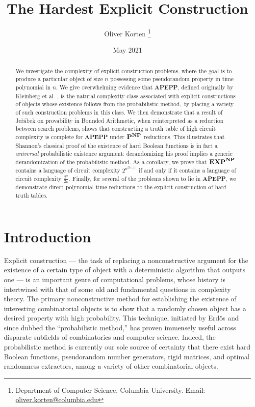 \documentclass[11pt]{article}
\author{Oliver Korten \thanks{Department of Computer Science, Columbia University. Email: \href{mailto:oliver.korten@columbia.edu}{oliver.korten@columbia.edu}}}
\date{May 2021}
\title{The Hardest Explicit Construction}
\newcommand{\varbound}{\frac{2^n}{2n}}
\def\cl{\bf}
\begin{document}
\maketitle
 
\begin{abstract}
We investigate the complexity of explicit construction problems, where the goal is to produce a particular object of size $n$ possessing some pseudorandom property in time polynomial in $n$. We give overwhelming evidence that {\cl APEPP}, defined originally by Kleinberg et al. \cite{total}, is the natural complexity class associated with explicit constructions of objects whose existence follows from the probabilistic method, by placing a variety of such construction problems in this class.
We then demonstrate that a result of Je\v{r}\'{a}bek \cite{Jerabek} on provability in Bounded Arithmetic, when reinterpreted as a reduction between search problems, shows that constructing a truth table of high circuit complexity is complete for {\cl APEPP} under ${\cl P}^{\cl NP}$ reductions. This illustrates that Shannon's classical proof of the existence of hard Boolean functions is in fact a \emph{universal} probabilistic existence argument: derandomizing his proof implies a generic derandomization of the probabilistic method.
As a corollary, we prove that  ${\cl EXP}^{\cl NP}$ contains a language of circuit complexity $2^{n^{\Omega(1)}}$ if and only if it contains a language of circuit complexity $\varbound$.
Finally, for several of the problems shown to lie in {\cl APEPP}, we demonstrate direct polynomial time reductions to the explicit construction of hard truth tables.
\end{abstract}
\newpage
\section{Introduction}\label{sec:intro}
Explicit construction --- the task of replacing a nonconstructive argument for the existence of a certain type of object with a deterministic algorithm that outputs one --- is an important genre of computational problems, whose history is intertwined with that of some old and fundamental questions in complexity theory. The primary nonconstructive method for establishing the existence of interesting combinatorial objects is to show that a randomly chosen object has a desired property with high probability. This technique, initiated by Erd{\"o}s \cite{Erdos} and since dubbed the ``probabilistic method,'' has proven immensely useful across disparate subfields of combinatorics and computer science. Indeed, the probabilistic method is currently our sole source of certainty that there exist hard Boolean functions, pseudorandom number generators, rigid matrices, and optimal randomness extractors, 
among a variety of other combinatorial objects. 
\end{document}
